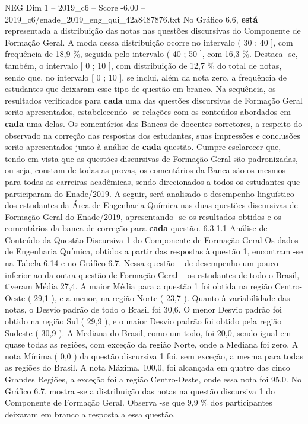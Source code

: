 \begin{textsample}{NEG Dim 1 – 2019\_c6 – Score -6.00 – 2019\_c6/enade\_2019\_eng\_qui\_42a8487876.txt}
No Gráfico 6.6, \textbf{está} representada a distribuição das notas nas questões discursivas do Componente de Formação Geral.
A moda dessa distribuição ocorre no intervalo ( 30 ; 40 ], com frequência de 18,9 \%, seguida pelo intervalo ( 40 ; 50 ], com 16,3 \%.
Destaca -se, também, o intervalo [ 0 ; 10 ], com distribuição de 12,7 \% do total de notas, sendo que, no intervalo [ 0 ; 10 ], se inclui, além da nota zero, a frequência de estudantes que deixaram esse tipo de questão em branco.
Na sequência, os resultados verificados para \textbf{cada} uma das questões discursivas de Formação Geral serão apresentados, estabelecendo -se relações com os conteúdos abordados em \textbf{cada} uma delas.
Os comentários das Bancas de docentes corretores, a respeito do observado na correção das respostas dos estudantes, suas impressões e conclusões serão apresentados junto à análise de \textbf{cada} questão.
Cumpre esclarecer que, tendo em vista que as questões discursivas de Formação Geral são padronizadas, ou seja, constam de todas as provas, os comentários da Banca são os mesmos para todas as carreiras acadêmicas, sendo direcionados a todos os estudantes que participaram do Enade/2019.
A seguir, será analisado o desempenho linguístico dos estudantes da Área de Engenharia Química nas duas questões discursivas de Formação Geral do Enade/2019, apresentando -se os resultados obtidos e os comentários da banca de correção para \textbf{cada} questão. 6.3.1.1 Análise de Conteúdo da Questão Discursiva 1 do Componente de Formação Geral Os dados de Engenharia Química, obtidos a partir das respostas à questão 1, encontram -se na Tabela 6.14 e no Gráfico 6.7.
Nessa questão – de desempenho um pouco inferior ao da outra questão de Formação Geral – os estudantes de todo o Brasil, tiveram Média 27,4.
A maior Média para a questão 1 foi obtida na região Centro-Oeste ( 29,1 ), e a menor, na região Norte ( 23,7 ).
Quanto à variabilidade das notas, o Desvio padrão de todo o Brasil foi 30,6.
O menor Desvio padrão foi obtido na região Sul ( 29,9 ), e o maior Desvio padrão foi obtido pela região Sudeste ( 30,9 ).
A Mediana do Brasil, como um todo, foi 20,0, sendo igual em quase todas as regiões, com exceção da região Norte, onde a Mediana foi zero.
A nota Mínima ( 0,0 ) da questão discursiva 1 foi, sem exceção, a mesma para todas as regiões do Brasil.
A nota Máxima, 100,0, foi alcançada em quatro das cinco Grandes Regiões, a exceção foi a região Centro-Oeste, onde essa nota foi 95,0.
No Gráfico 6.7, mostra -se a distribuição das notas na questão discursiva 1 do Componente de Formação Geral.
Observa -se que 9,9 \% dos participantes deixaram em branco a resposta a essa questão.

\end{textsample}
